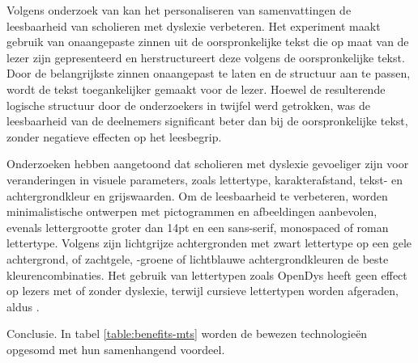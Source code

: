 \medspace

Volgens onderzoek van \textcite{Nandhini2013} kan het personaliseren van samenvattingen de leesbaarheid van scholieren met dyslexie verbeteren. Het experiment maakt gebruik van onaangepaste zinnen uit de oorspronkelijke tekst die op maat van de lezer zijn gepresenteerd en herstructureert deze volgens de oorspronkelijke tekst. Door de belangrijkste zinnen onaangepast te laten en de structuur aan te passen, wordt de tekst toegankelijker gemaakt voor de lezer. Hoewel de resulterende logische structuur door de onderzoekers in twijfel werd getrokken, was de leesbaarheid van de deelnemers significant beter dan bij de oorspronkelijke tekst, zonder negatieve effecten op het leesbegrip.

\medspace

Onderzoeken hebben aangetoond dat scholieren met dyslexie gevoeliger zijn voor veranderingen in visuele parameters, zoals lettertype, karakterafstand, tekst- en achtergrondkleur en grijswaarden. Om de leesbaarheid te verbeteren, worden minimalistische ontwerpen met pictogrammen en afbeeldingen aanbevolen, evenals lettergrootte groter dan 14pt en een sans-serif, monospaced of roman lettertype. Volgens \textcite{Rello2015, Bezem2016, Rello2017} zijn lichtgrijze achtergronden met zwart lettertype op een gele achtergrond, of zachtgele, -groene of lichtblauwe achtergrondkleuren de beste kleurencombinaties. Het gebruik van lettertypen zoals OpenDys heeft geen effect op lezers met of zonder dyslexie, terwijl cursieve lettertypen worden afgeraden, aldus \textcite{Rello2013b, Rello2015}.

\medspace

Conclusie. In tabel \ref{table:benefits-mts} worden de bewezen technologieën opgesomd met hun samenhangend voordeel.

\medspace

